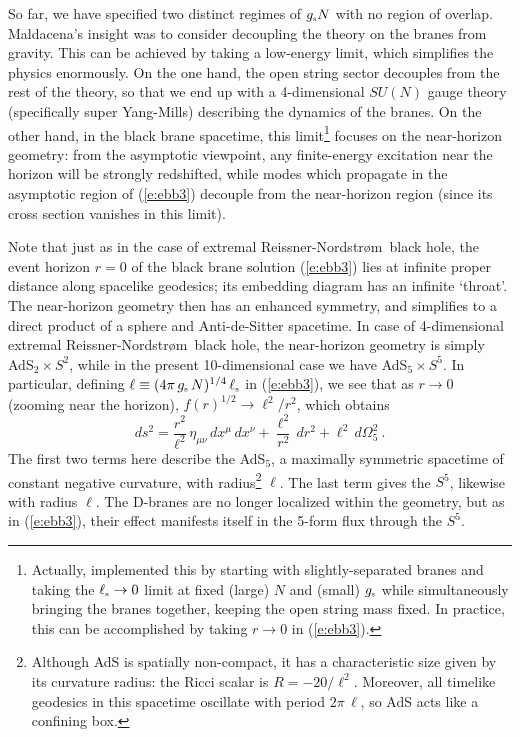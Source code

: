 \documentclass[12pt,a4paper]{article}
\def\req#1{(\ref{#1})}
\def\RN{Reissner-Nordstr\o m}
\def\gst{g_{\scriptscriptstyle {\rm s}}}
\def\lst{\ell_{\scriptscriptstyle {\rm s}}}
\def\adss#1#2{AdS$_{#1} \times S^{#2}$}
\def\Rads{\ell}
\begin{document}
So far, we have specified two distinct regimes of $\gst N$ with no region of overlap.  Maldacena's insight was to consider decoupling the theory on the branes from gravity.  This can be achieved by taking a low-energy limit, which simplifies the physics enormously.    
On the one hand, the open string sector decouples from the rest of the theory, so that we end up with a 4-dimensional $SU(N)$ gauge theory (specifically super Yang-Mills) describing the dynamics of the branes.  On the other hand, in the black brane spacetime, this limit\footnote{
Actually, \cite{Maldacena:1997re} implemented this by starting with slightly-separated branes and taking the $\lst \to 0$ limit at fixed (large) $N$ and (small) $\gst$ while simultaneously bringing the branes together, keeping the open string mass fixed.  In practice, this can be accomplished by taking $r \to 0$ in \req{e:ebb3}. } focuses on the near-horizon geometry:  from the asymptotic viewpoint, any finite-energy excitation near the horizon will be strongly redshifted, while modes which propagate in the asymptotic region of \req{e:ebb3} decouple from the near-horizon region (since its cross section vanishes in this limit). 

Note that just as in the case of extremal \RN\ black hole,  the event horizon $r=0$ of the black brane solution  \req{e:ebb3} lies at infinite proper distance along spacelike geodesics; its embedding diagram has an infinite `throat'. The near-horizon geometry then has an enhanced symmetry, and simplifies to a direct product of a sphere and Anti-de-Sitter spacetime.  In case of 4-dimensional extremal \RN\ black hole, the near-horizon geometry is simply \adss22,  while in the present 10-dimensional case we have \adss55.  In particular, defining  $\Rads \equiv (4 \pi \, \gst \, N)^{1/4} \, \lst$ in \req{e:ebb3}, we see that  as $r \to 0$ (zooming near the horizon), 
$f(r)^{1/2} \to \Rads^2/r^2$, which obtains
%
\begin{equation}
ds^2 = \frac{r^2}{\Rads^2} \,  \eta_{\mu\nu} \, dx^\mu \, dx^\nu 
+ \frac{\Rads^2}{r^2} \, dr^2 + \Rads^2 \, d\Omega_5^2 \ .
\label{e:A5S5}
\end{equation}	
%
The first two terms here describe the AdS$_5$, a maximally symmetric spacetime of constant negative curvature, with radius\footnote{
Although AdS is spatially non-compact, it has a characteristic size given by its curvature radius:  the Ricci scalar is 
$R=-20 / \Rads^2$. 
Moreover, all timelike geodesics in this spacetime oscillate with period $2 \pi \, \Rads$, so AdS acts like a confining box.
} 
$\Rads$. The last term gives the $S^5$, 
likewise with radius  $\Rads$.
The D-branes are no longer localized within the geometry, but as in \req{e:ebb3}, their effect manifests itself in the 5-form flux through the $S^5$.
\end{document}
